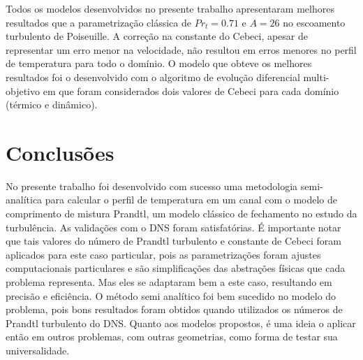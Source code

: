 Todos os modelos desenvolvidos no presente trabalho apresentaram melhores resultados que a parametrização clássica de $ Pr_t = 0.71 $ e $ A = 26 $ no escoamento turbulento de Poiseuille. A correção na constante do Cebeci, apesar de representar um erro menor na velocidade, não resultou em erros menores no perfil de temperatura para todo o domínio. O modelo que obteve os melhores resultados foi o desenvolvido com o algoritmo de evolução diferencial multi-objetivo em que foram considerados dois valores de Cebeci para cada domínio (térmico e dinâmico).

\section{Conclusões}

No presente trabalho foi desenvolvido com sucesso uma metodologia semi-analítica para calcular o perfil de temperatura em um canal com o modelo de comprimento de mistura Prandtl, um modelo clássico de fechamento no estudo da turbulência. As validações com o DNS foram satisfatórias. É importante notar que tais valores do número de Prandtl turbulento e constante de Cebeci foram aplicados para este caso particular, pois as parametrizações foram ajustes computacionais particulares e são simplificações das abstrações físicas que cada problema representa. Mas eles se adaptaram bem a este caso, resultando em precisão e eficiência. O método semi analítico foi bem sucedido no modelo do problema, pois bons resultados foram obtidos quando utilizados os números de Prandtl turbulento do DNS. Quanto aos modelos propostos, é uma ideia o aplicar então em outros problemas, com outras geometrias, como forma de testar sua universalidade.